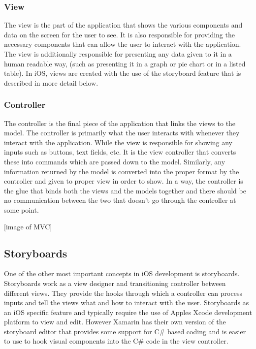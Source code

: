 \documentclass[main.tex]{subfiles}
\begin{document}
\subsubsection{View}

The view is the part of the application that shows the various components and data on the screen for the user to see. It is also responsible for providing the necessary components that can allow the user to interact with the application. The view is additionally responsible for presenting any data given to it in a human readable way, (such as presenting it in a graph or pie chart or in a listed table). In iOS, views are created with the use of the storyboard feature that is described in more detail below.

\subsubsection{Controller}

The controller is the final piece of the application that links the views to the model. The controller is primarily what the user interacts with whenever they interact with the application. While the view is responsible for showing any inputs such as buttons, text fields, etc. It is the view controller that converts these into commands which are passed down to the model. Similarly, any information returned by the model is converted into the proper format by the controller and given to proper view in order to show. In a way, the controller is the glue that binds both the views and the models together and there should be no communication between the two that doesn’t go through the controller at some point.

[image of MVC]

\subsection{Storyboards}
One of the other most important concepts in iOS development is storyboards. Storyboards work as a view designer and transitioning controller between different views. They provide the hooks through which a controller can process inputs and tell the views what and how to interact with the user. Storyboards as an iOS specific feature and typically require the use of Apples Xcode development platform to view and edit. However Xamarin has their own version of the storyboard editor that provides some support for C\# based coding and is easier to use to hook visual components into the C\# code in the view controller.
\end{document}
